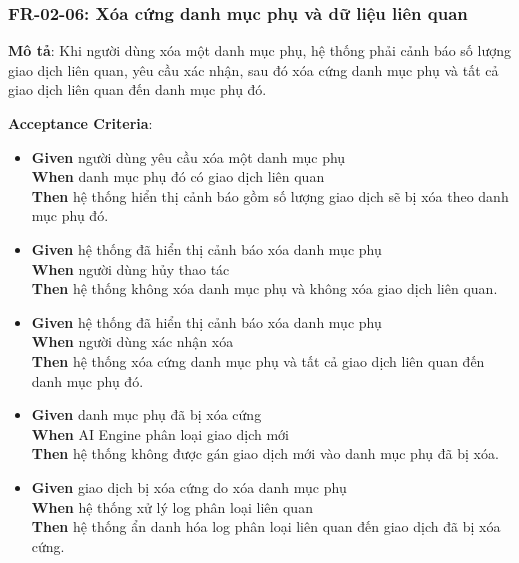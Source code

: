 \subsubsection{FR-02-06: Xóa cứng danh mục phụ và dữ liệu liên quan}

\textbf{Mô tả}: Khi người dùng xóa một danh mục phụ, hệ thống phải cảnh báo số lượng giao dịch liên quan, yêu cầu xác nhận, sau đó xóa cứng danh mục phụ và tất cả giao dịch liên quan đến danh mục phụ đó.



\textbf{Acceptance Criteria}:

\begin{itemize}
\item \textbf{Given} người dùng yêu cầu xóa một danh mục phụ  \\ \hspace*{1.5em}  \textbf{When} danh mục phụ đó có giao dịch liên quan  \\ \hspace*{1.5em}  \textbf{Then} hệ thống hiển thị cảnh báo gồm số lượng giao dịch sẽ bị xóa theo danh mục phụ đó.
\item \textbf{Given} hệ thống đã hiển thị cảnh báo xóa danh mục phụ  \\ \hspace*{1.5em}  \textbf{When} người dùng hủy thao tác  \\ \hspace*{1.5em}  \textbf{Then} hệ thống không xóa danh mục phụ và không xóa giao dịch liên quan.
\item \textbf{Given} hệ thống đã hiển thị cảnh báo xóa danh mục phụ  \\ \hspace*{1.5em}  \textbf{When} người dùng xác nhận xóa  \\ \hspace*{1.5em}  \textbf{Then} hệ thống xóa cứng danh mục phụ và tất cả giao dịch liên quan đến danh mục phụ đó.
\item \textbf{Given} danh mục phụ đã bị xóa cứng  \\ \hspace*{1.5em}  \textbf{When} AI Engine phân loại giao dịch mới  \\ \hspace*{1.5em}  \textbf{Then} hệ thống không được gán giao dịch mới vào danh mục phụ đã bị xóa.
\item \textbf{Given} giao dịch bị xóa cứng do xóa danh mục phụ  \\ \hspace*{1.5em}  \textbf{When} hệ thống xử lý log phân loại liên quan  \\ \hspace*{1.5em}  \textbf{Then} hệ thống ẩn danh hóa log phân loại liên quan đến giao dịch đã bị xóa cứng.
\end{itemize}

